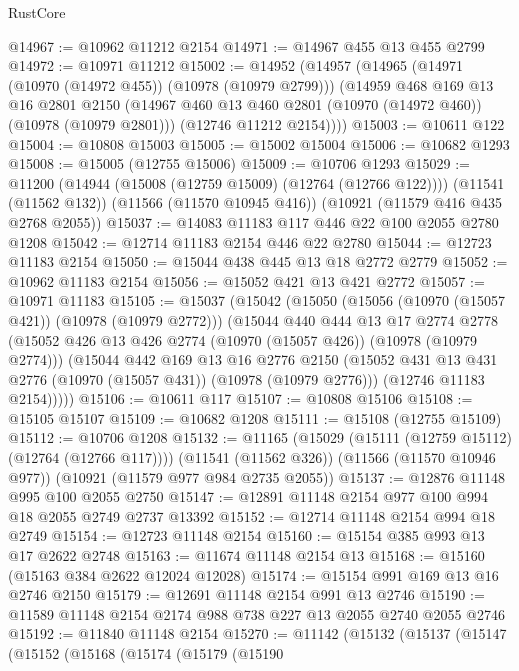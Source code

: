 \begin{lexlean}{RustCore}
\begin{coremodule}
@14967 := @10962 @11212 @2154
@14971 := @14967 @455 @13 @455 @2799
@14972 := @10971 @11212
@15002 := @14952
    (@14957
      (@14965
        (@14971 (@10970 (@14972 @455)) (@10978 (@10979 @2799)))
        (@14959
          @468
          @169
          @13
          @16
          @2801
          @2150
          (@14967 @460 @13 @460 @2801 (@10970 (@14972 @460)) (@10978 (@10979 @2801)))
          (@12746 @11212 @2154))))
@15003 := @10611 @122
@15004 := @10808 @15003
@15005 := @15002 @15004
@15006 := @10682 @1293
@15008 := @15005 (@12755 @15006)
@15009 := @10706 @1293
@15029 := @11200
    (@14944 (@15008 (@12759 @15009) (@12764 (@12766 @122))))
    (@11541 (@11562 @132))
    (@11566 (@11570 @10945 @416))
    (@10921 (@11579 @416 @435 @2768 @2055))
@15037 := @14083 @11183 @117 @446 @22 @100 @2055 @2780 @1208
@15042 := @12714 @11183 @2154 @446 @22 @2780
@15044 := @12723 @11183 @2154
@15050 := @15044 @438 @445 @13 @18 @2772 @2779
@15052 := @10962 @11183 @2154
@15056 := @15052 @421 @13 @421 @2772
@15057 := @10971 @11183
@15105 := @15037
    (@15042
      (@15050
        (@15056 (@10970 (@15057 @421)) (@10978 (@10979 @2772)))
        (@15044
          @440
          @444
          @13
          @17
          @2774
          @2778
          (@15052 @426 @13 @426 @2774 (@10970 (@15057 @426)) (@10978 (@10979 @2774)))
          (@15044
            @442
            @169
            @13
            @16
            @2776
            @2150
            (@15052 @431 @13 @431 @2776 (@10970 (@15057 @431)) (@10978 (@10979 @2776)))
            (@12746 @11183 @2154)))))
@15106 := @10611 @117
@15107 := @10808 @15106
@15108 := @15105 @15107
@15109 := @10682 @1208
@15111 := @15108 (@12755 @15109)
@15112 := @10706 @1208
@15132 := @11165
    (@15029 (@15111 (@12759 @15112) (@12764 (@12766 @117))))
    (@11541 (@11562 @326))
    (@11566 (@11570 @10946 @977))
    (@10921 (@11579 @977 @984 @2735 @2055))
@15137 := @12876 @11148 @995 @100 @2055 @2750
@15147 := @12891 @11148 @2154 @977 @100 @994 @18 @2055 @2749 @2737 @13392
@15152 := @12714 @11148 @2154 @994 @18 @2749
@15154 := @12723 @11148 @2154
@15160 := @15154 @385 @993 @13 @17 @2622 @2748
@15163 := @11674 @11148 @2154 @13
@15168 := @15160 (@15163 @384 @2622 @12024 @12028)
@15174 := @15154 @991 @169 @13 @16 @2746 @2150
@15179 := @12691 @11148 @2154 @991 @13 @2746
@15190 := @11589 @11148 @2154 @2174 @988 @738 @227 @13 @2055 @2740 @2055 @2746
@15192 := @11840 @11148 @2154
@15270 := @11142
    (@15132
      (@15137
        (@15147
          (@15152
            (@15168
              (@15174
                (@15179
                  (@15190

\end{coremodule}
\end{lexlean}
